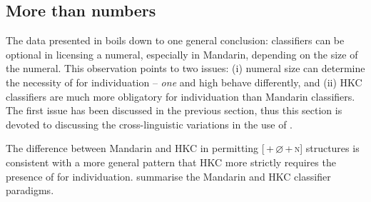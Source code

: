 \documentclass[output=paper]{langsci/langscibook}
\begin{document}
\subsection{More than numbers}\label{sub:23.2.3}

The data presented in  boils down to one general conclusion:
classifiers can be optional in licensing a numeral, especially in
Mandarin, depending on the size of the numeral. This
observation points to two issues: (i) numeral size can determine
the necessity of  for individuation -- \emph{one} and high
 behave differently, and (ii) \gls{HKC} classifiers are much more
obligatory for individuation than Mandarin classifiers. The first issue has
been discussed in the previous section, thus this section is devoted to
discussing the cross-linguistic variations in the use of .

The difference between Mandarin and \gls{HKC} in permitting [\Num{}\,+\,${\varnothing}$\,+\,\textsc{n}] 
structures is consistent with a more general pattern that
\gls{HKC} more strictly requires the presence of  for individuation.
 summarise the Mandarin and \gls{HKC} classifier
paradigms.
\end{document}
